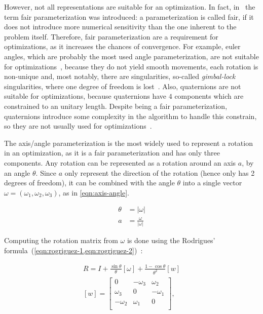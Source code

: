 \documentclass[conference]{IEEEtran}
\begin{document}
However, not all representations are suitable for an optimization. In fact, in~\cite{hornegger99} the term fair parameterization was introduced: a parameterization is called fair, if it does not introduce more numerical sensitivity than the one inherent to the problem itself. Therefore, fair parameterization are a requirement for optimizations, as it increases the chances of convergence. For example, euler angles, which are probably the most used angle parameterization, are not suitable for optimizations~\cite{schmidt01}, because they do not yield smooth movements, each rotation is non-unique and, most notably, there are singularities, so-called \textit{gimbal-lock} singularities, where one degree of freedom is lost~\cite{schmidt01}. Also, quaternions are not suitable for optimizations, because quaternions have $4$ components which are constrained to an unitary length. Despite being a fair parameterization, quaternions introduce some complexity in the algorithm to handle this constrain, so they are not usually used for optimizations~\cite{schmidt01}.

The axis/angle parameterization is the most widely used to represent a rotation in an optimization, as it is a fair parameterization and has only three components. Any rotation can be represented as a rotation around an axis $a$, by an angle $\theta$. Since $a$ only represent the direction of the rotation (hence only has 2 degrees of freedom), it can be combined with the angle $\theta$ into a single vector $\omega = \left(\omega_1, \omega_2, \omega_3\right)$, as in \cref{eqn:axis-angle}.

\begin{equation}
    \label{eqn:axis-angle}
    \begin{aligned}
        \theta & = |\omega| \\
        a & = \frac{\omega}{|\omega|}
    \end{aligned}
\end{equation}

Computing the rotation matrix from $\omega$ is done using the Rodrigues' formula~(\cref{eqn:rogriguez-1,eqn:rogriguez-2})~\cite{schmidt01}:

\begin{align}
    \label{eqn:rogriguez-1}
    R = I + \frac{\sin \theta}{\theta} [\omega] + \frac{1 - \cos \theta}{\theta^2} [w] \\
    \label{eqn:rogriguez-2}
    [w] = \left[
        \begin{array}{ccc}
            0  & -\omega_3 & \omega_2 \\
            \omega_3 & 0   & -\omega_1 \\
            -\omega_2 & \omega_1 & 0 \\
        \end{array}
    \right],
\end{align}
\end{document}
